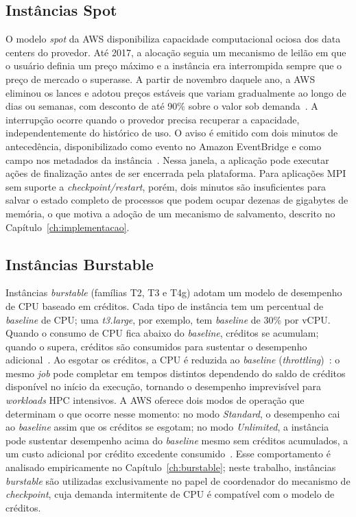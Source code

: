 \subsection{Instâncias Spot}
\label{sec:spot}

O modelo \textit{spot} da AWS disponibiliza capacidade computacional ociosa dos
data centers do provedor. Até 2017, a alocação seguia um mecanismo de leilão em que o
usuário definia um preço máximo e a instância era interrompida sempre que o preço
de mercado o superasse. A partir de novembro daquele ano, a AWS eliminou os lances
e adotou preços estáveis que variam gradualmente ao longo de dias ou semanas, com
desconto de até 90\% sobre o valor sob demanda~\cite{aws2018spot}. A
interrupção ocorre quando o provedor precisa recuperar a capacidade, independentemente
do histórico de uso. O aviso é emitido com dois minutos de antecedência,
disponibilizado como evento no Amazon EventBridge e como campo nos metadados da
instância~\cite{aws2026spot_termination}. Nessa janela, a aplicação pode executar
ações de finalização antes de ser encerrada pela plataforma. Para aplicações MPI sem
suporte a \textit{checkpoint/restart}, porém, dois minutos são insuficientes para
salvar o estado completo de processos que podem ocupar dezenas de gigabytes de
memória, o que motiva a adoção de um mecanismo de salvamento, descrito no
Capítulo~\ref{ch:implementacao}.

\subsection{Instâncias Burstable}
\label{sec:burstable}

Instâncias \textit{burstable} (famílias T2, T3 e T4g) adotam um modelo de
desempenho de CPU baseado em créditos. Cada tipo de instância tem um percentual de
\textit{baseline} de CPU; uma \textit{t3.large},
por exemplo, tem \textit{baseline} de 30\% por vCPU. Quando o
consumo de CPU fica abaixo do \textit{baseline}, créditos se acumulam;
quando o supera, créditos são consumidos para sustentar o desempenho
adicional~\cite{aws2026burstable}. Ao esgotar os créditos, a CPU é reduzida ao \textit{baseline}
(\textit{throttling})~\cite{wang2017burstable}: o mesmo \textit{job} pode completar
em tempos distintos dependendo do saldo de créditos disponível no início da execução,
tornando o desempenho imprevisível para \textit{workloads} HPC intensivos. A AWS
oferece dois modos de operação que determinam o que ocorre nesse momento: no modo
\textit{Standard}, o desempenho cai ao \textit{baseline} assim que os créditos se
esgotam; no modo \textit{Unlimited}, a instância pode sustentar desempenho acima do
\textit{baseline} mesmo sem créditos acumulados, a um custo adicional por crédito
excedente consumido~\cite{aws2026burstable}. Esse comportamento é analisado
empiricamente no Capítulo~\ref{ch:burstable}; neste trabalho, instâncias
\textit{burstable} são utilizadas exclusivamente no papel de coordenador do mecanismo
de \textit{checkpoint}, cuja demanda intermitente de CPU é compatível com o modelo
de créditos.


